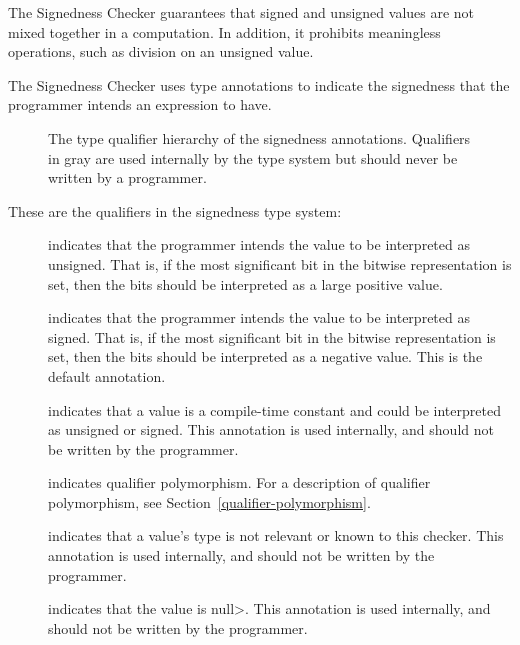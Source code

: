 \htmlhr
{}

The Signedness Checker guarantees that signed and unsigned values are not mixed
together in a computation. In addition, it prohibits meaningless operations, such
as division on an unsigned value.



The Signedness Checker uses type annotations to indicate the signedness that the programmer intends an expression to have.

\begin{figure}
\caption{The type qualifier hierarchy of the signedness annotations.
Qualifiers in gray are used internally by the type system but should never be written by a programmer.}
\label{fig-signedness-hierarchy}
\end{figure}

These are the qualifiers in the signedness type system:

\begin{description}

\item[]
    indicates that the programmer intends the value to be
    interpreted as unsigned.
    That is, if the most significant bit in the bitwise representation is
    set, then the bits should be interpreted as a large positive value.

\item[]
    indicates that the programmer intends the value to be
    interpreted as signed.
    That is, if the most significant bit in the bitwise representation is
    set, then the bits should be interpreted as a negative value.
    This is the default annotation.

\item[]
    indicates that a value is a compile-time constant and could be
    interpreted as unsigned or signed.
    This annotation is used internally, and should not
    be written by the programmer.

 \item[]
   indicates qualifier polymorphism.
   For a description of qualifier polymorphism, see
   Section~\ref{qualifier-polymorphism}.

\item[]
    indicates that a value's type is not relevant or known to this checker.
    This annotation is used internally, and should not be
    written by the programmer.

\item[]
  indicates that the value is \<null>.
    This annotation is used internally, and should not
    be written by the programmer.

\end{description}

